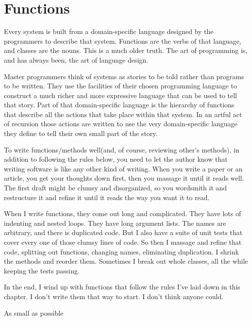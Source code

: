 
\chapter{Functions}

Every system is built from a domain-specific language designed by the programmers to describe that system. Functions are the verbs of that language, and classes are the nouns. This is a much older truth. The art of programming is, and has always been, the art of language design.

Master programmers think of systems as stories to be told rather than programs to be written. They use the facilities of their chosen programming language to construct a much richer and more expressive language that can be used to tell that story. Part of that domain-specific language is the hierarchy of functions that describe all the actions that take place within that system. In an artful act of recursion those actions are written to use the very domain-specific language they define to tell their own small part of the story.

To write functions/methods well(and, of course, reviewing other's methods), in addition to following the rules below, you need to let the author know that writing software is like any other kind of writing. When you write a paper or an article,
you get your thoughts down first, then you massage it until it reads well. The first draft might be clumsy and disorganized, so you wordsmith it and restructure it and refine it until it reads the way you want it to read.

When I write functions, they come out long and complicated. They have lots of
indenting and nested loops. They have long argument lists. The names are arbitrary, and there is duplicated code. But I also have a suite of unit tests that cover every one of those clumsy lines of code. So then I massage and refine that code, splitting out functions, changing names, eliminating duplication. I shrink the methods and reorder them. Sometimes I break out whole classes, all the while keeping the tests passing.

In the end, I wind up with functions that follow the rules I’ve laid down in this chapter. I don't write them that way to start. I don’t think anyone could.

\begin{tcolorbox}[breakable, colback=green!10!white, colframe=green!85!black, center title, title = Golden Rule of Functions]
\begin{center}
As small as possible
\end{center}
\end{tcolorbox}

